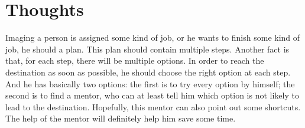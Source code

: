 \section{Thoughts}
Imaging a person is assigned some kind of job, or he wants to finish some kind of job, he should a plan. This plan should contain multiple steps. Another fact is that, for each step, there will be multiple options. In order to reach the destination as soon as possible, he should choose the right option at each step. And he has basically two options: the first is to try every option by himself; the second is to find a mentor, who can at least tell him which option is not likely to lead to the destination. Hopefully, this mentor can also point out some shortcuts. The help of the mentor will definitely help him save some time. 

